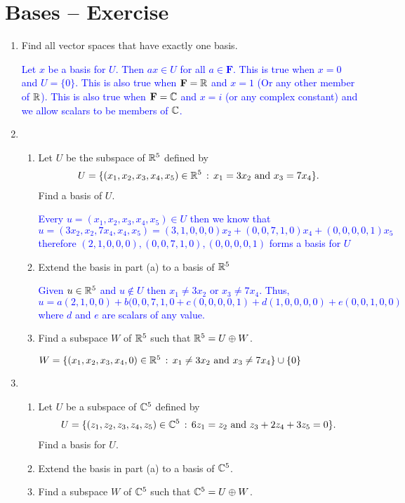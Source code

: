 \documentclass[10pt,a4paper]{report}
\newcommand{\BLUE}[1]{\textcolor{blue}{#1}}
\newcommand{\F}{\textbf{F}}
\begin{document}
\section{Bases -- Exercise}

\begin{enumerate}
	\item Find all vector spaces that have exactly one basis.
	
	\BLUE{Let $x$ be a basis for $U$.  Then $ax \in U$ for all $a \in \F$.  This is true when $x=0$ and $U=\{0\}$.  This is also true when $\F = \R$ and $x=1$ (Or any other member of $\mathbb{R}$).  This is also true when $\F = \C$ and $x=i$ (or any complex constant) and we allow scalars to be members of $\mathbb{C}$.
	}
	
	\item \begin{enumerate}
		\item Let $U$ be the subspace of $\mathbb{R}^5$ defined by
		\begin{align*}
			U=\{(x_1,x_2,x_3,x_4,x_5)\in \mathbb{R}^5\,:\,x_1=3x_2\text{ and } x_3=7x_4\}.
		\end{align*}Find a basis of $U$.
		
		\BLUE{Every $u=(x_1,x_2,x_3,x_4,x_5) \in U$ then we know that $u=(3x_2,x_2,7x_4,x_4,x_5)=(3,1,0,0,0)x_2+(0,0,7,1,0)x_4+(0,0,0,0,1)x_5$ therefore  $(2,1,0,0,0), (0,0,7,1,0), (0,0,0,0,1)$ forms a basis for $U$
		}
		
		\item Extend the basis in part (a) to a basis of $\mathbb{R}^5$
		
		\BLUE{Given $u \in \mathbb{R}^5$ and $u \not \in U$ then $x_1 \ne 3x_2$ or $x_3 \ne 7x_4$.  Thus, $u=a(2,1,0,0)+b(0,0,7,1,0+c(0,0,0,0,1)+d(1,0,0,0,0)+e(0,0,1,0,0)$ where $d$ and $e$ are scalars of any value. 
		}
		
		\item Find a subspace $W$ of $\mathbb{R}^5$ such that $\mathbb{R}^5=U\oplus W$.
		
		\BLUE{$W = \{(x_1,x_2,x_3,x_4,0)\in \mathbb{R}^5\,:\,x_1\ne3x_2\text{ and } x_3\ne7x_4\}\cup\{0\}$}
	\end{enumerate}
	
	\item \begin{enumerate}
		\item Let $U$ be a subspace of $\mathbb{C}^5$ defined by 
		\begin{align*}
			U=\{(z_1,z_2,z_3,z_4,z_5)\in\mathbb{C}^5\,:\, 6z_1=z_2\text{ and } z_3+2z_4+3z_5=0\}.
		\end{align*}Find a basis for $U$.
		\item Extend the basis in part (a) to a basis of $\mathbb{C}^5$.
		\item Find a subspace $W$ of $\mathbb{C}^5$ such that $\mathbb{C}^5=U\oplus W$.
	\end{enumerate}
	

\end{enumerate}
\end{document}
